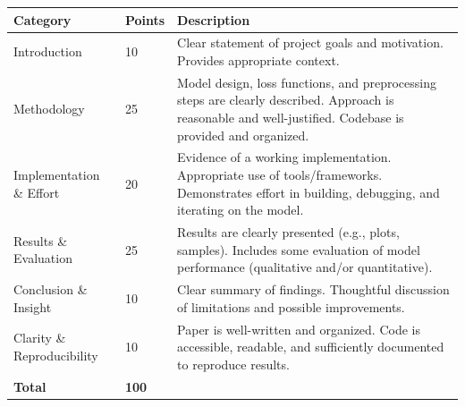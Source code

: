 \documentclass[letterpaper]{inzane_syllabus} %
\begin{document}
\begin{center}
\begin{tabular}{p{4cm} p{2cm} p{8cm}}
\toprule
\textbf{Category} & \textbf{Points} & \textbf{Description} \\
\midrule

Introduction & 10 &
Clear statement of project goals and motivation. Provides appropriate context. \\

Methodology & 25 &
Model design, loss functions, and preprocessing steps are clearly described. Approach is reasonable and well-justified. Codebase is provided and organized. \\

Implementation \& Effort & 20 &
Evidence of a working implementation. Appropriate use of tools/frameworks. Demonstrates effort in building, debugging, and iterating on the model. \\

Results \& Evaluation & 25 &
Results are clearly presented (e.g., plots, samples). Includes some evaluation of model performance (qualitative and/or quantitative). \\

Conclusion \& Insight & 10 &
Clear summary of findings. Thoughtful discussion of limitations and possible improvements. \\

Clarity \& Reproducibility & 10 &
Paper is well-written and organized. Code is accessible, readable, and sufficiently documented to reproduce results. \\

\midrule
\textbf{Total} & \textbf{100} & \\
\bottomrule
\end{tabular}
\end{center}
\end{document}
